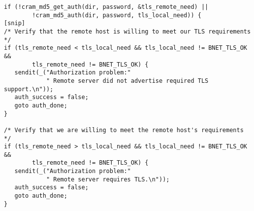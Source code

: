 \footnotesize
\begin{verbatim}
if (!cram_md5_get_auth(dir, password, &tls_remote_need) ||
        !cram_md5_auth(dir, password, tls_local_need)) {
[snip]
/* Verify that the remote host is willing to meet our TLS requirements */
if (tls_remote_need < tls_local_need && tls_local_need != BNET_TLS_OK &&
        tls_remote_need != BNET_TLS_OK) {
   sendit(_("Authorization problem:"
            " Remote server did not advertise required TLS support.\n"));
   auth_success = false;
   goto auth_done;
}

/* Verify that we are willing to meet the remote host's requirements */
if (tls_remote_need > tls_local_need && tls_local_need != BNET_TLS_OK &&
        tls_remote_need != BNET_TLS_OK) {
   sendit(_("Authorization problem:"
            " Remote server requires TLS.\n"));
   auth_success = false;
   goto auth_done;
}
\end{verbatim}
\normalsize
